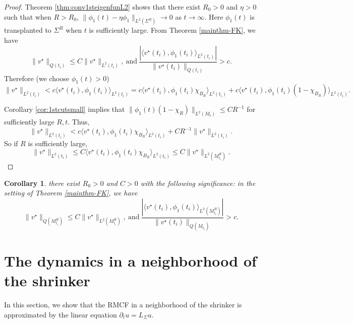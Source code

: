 \documentclass[12pt]{amsart}
\numberwithin{equation}{section}
\newtheorem{corollary}[theorem]{Corollary}
\numberwithin{equation}{section}
\begin{document}
	\begin{proof}
		Theorem \ref{thm:conv1steigenfunL2} shows that there exist $R_0>0$ and $\eta>0$ such that when $R>R_0$, $\|\phi_1(t)-\eta\phi_1\|_{L^2(\Sigma^R)}\to 0$ as $t\to\infty$. Here $\phi_1(t)$ is transplanted to $\Sigma^R$ when $t$ is sufficiently large. From Theorem \ref{mainthm-FK}, we have
		$$\|v^\star\|_{Q({t_i})}\leq C\|v^\star\|_{L^2({t_i})},\ \mathrm{and}\ \frac{|\langle v^\star(t_i),\phi_1(t_i)\rangle_{L^2({t_i})}|}{\|v^\star(t_i)\|_{Q({t_i})}}>c.$$ 
		Therefore (we choose $\phi_1(t)>0$)
		\[\|v^\star\|_{L^2({t_i})}< c\langle v^\star(t_i),\phi_1(t_i)\rangle_{L^2({t_i})}= c\langle v^\star(t_i),\phi_1(t_i)\chi_{B_R}\rangle_{L^2({t_i})}+c\langle v^\star(t_i),\phi_1(t_i)(1-\chi_{B_R})\rangle_{L^2({t_i})}.\]
		
		Corollary \ref{cor:1stcutsmall} implies that $\|\phi_1(t)(1-\chi_R)\|_{L^2(M_t)}\leq CR^{-1}$ for sufficiently large $R,t$. Thus, 
		\[\|v^\star\|_{L^2(t_i)}<c\langle v^\star(t_i),\phi_1(t_i)\chi_{B_R}\rangle_{L^2({t_i})}+CR^{-1}\|v^\star\|_{L^2({t_i})}.\]
		So if $R$ is sufficiently large, 
		\[\|v^\star\|_{L^2({t_i})}\leq C\langle v^\star(t_i),\phi_1(t_i)\chi_{B_R}\rangle_{L^2({t_i})}\leq C \|v^\star\|_{L^2(M_{t_i}^R)}.\]
	\end{proof}
	
	\begin{corollary}\label{cor:vstarcutsmall}
		there exist $R_0>0$ and $C>0$ with the following significance: in the setting of Theorem \ref{mainthm-FK}, we have 
		$$\|v^\star\|_{Q(M_{t_i}^R)}\leq C\|v^\star\|_{L^2(M_{t_i}^R)},\ \mathrm{and}\ \frac{|\langle v^\star(t_i),\phi_1(t_i)\rangle_{L^2(M_{t_i}^R)}|}{\|v^\star(t_i)\|_{Q(M_{t_i})}}>c.$$ 
	\end{corollary}
	
	\section{The dynamics in a neighborhood of the shrinker}\label{S:Dynamics in a neighborhood of the shrinker}
	
	In this section, we show that the RMCF in a neighborhood of the shrinker is approximated by the linear equation $\partial_t u=L_\Sigma u$. 
	
\end{document}
